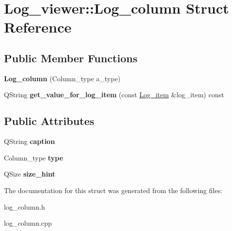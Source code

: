 \hypertarget{struct_log__viewer_1_1_log__column}{\section{Log\-\_\-viewer\-:\-:Log\-\_\-column Struct Reference}
\label{struct_log__viewer_1_1_log__column}
}
\subsection*{Public Member Functions}
\begin{DoxyCompactItemize}
\item 
\hypertarget{struct_log__viewer_1_1_log__column_a6db03fdeca6b91116292afb7247a8a81}{{\bfseries Log\-\_\-column} (Column\-\_\-type a\-\_\-type)}\label{struct_log__viewer_1_1_log__column_a6db03fdeca6b91116292afb7247a8a81}

\item 
\hypertarget{struct_log__viewer_1_1_log__column_a19ad3f181daecd0bc4769a93558d7cfc}{Q\-String {\bfseries get\-\_\-value\-\_\-for\-\_\-log\-\_\-item} (const \hyperlink{class_log__viewer_1_1_log__item}{Log\-\_\-item} \&log\-\_\-item) const }\label{struct_log__viewer_1_1_log__column_a19ad3f181daecd0bc4769a93558d7cfc}

\end{DoxyCompactItemize}
\subsection*{Public Attributes}
\begin{DoxyCompactItemize}
\item 
\hypertarget{struct_log__viewer_1_1_log__column_ab597497e9e74bfc6fb831b2ad8464411}{Q\-String {\bfseries caption}}\label{struct_log__viewer_1_1_log__column_ab597497e9e74bfc6fb831b2ad8464411}

\item 
\hypertarget{struct_log__viewer_1_1_log__column_a77442e95e6e2e2aa8d00da1472d18bd4}{Column\-\_\-type {\bfseries type}}\label{struct_log__viewer_1_1_log__column_a77442e95e6e2e2aa8d00da1472d18bd4}

\item 
\hypertarget{struct_log__viewer_1_1_log__column_a234e917aa4e678a64db56c0621f57e97}{Q\-Size {\bfseries size\-\_\-hint}}\label{struct_log__viewer_1_1_log__column_a234e917aa4e678a64db56c0621f57e97}

\end{DoxyCompactItemize}


The documentation for this struct was generated from the following files\-:\begin{DoxyCompactItemize}
\item 
log\-\_\-column.\-h\item 
log\-\_\-column.\-cpp\end{DoxyCompactItemize}
